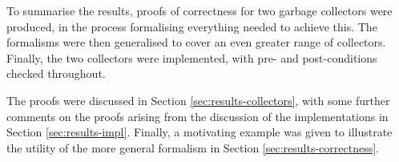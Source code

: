 To summarise the results, proofs of correctness for two garbage
collectors were produced, in the process formalising everything needed
to achieve this. The formalisms were then generalised to cover an even
greater range of collectors. Finally, the two collectors were
implemented, with pre- and post-conditions checked throughout.

The proofs were discussed in Section \ref{sec:results-collectors},
with some further comments on the proofs arising from the discussion
of the implementations in Section \ref{sec:results-impl}. Finally, a
motivating example was given to illustrate the utility of the more
general formalism in Section \ref{sec:results-correctness}.
